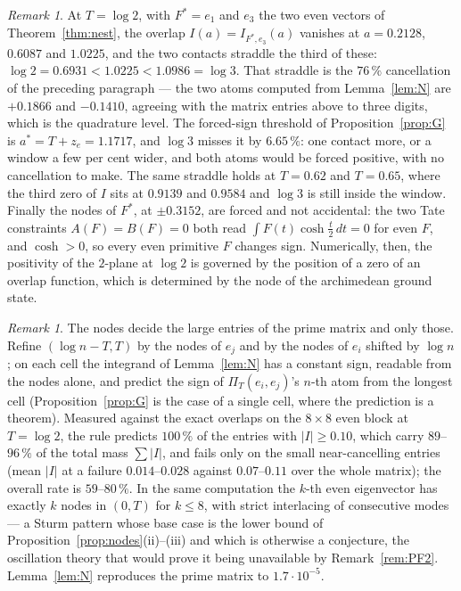 \documentclass[11pt]{amsart}
\theoremstyle{definition}
\theoremstyle{remark}
\newtheorem{remark}[theorem]{Remark}
\newcommand{\PiT}{\Pi_T}
\begin{document}
\begin{remark}\label{rem:nodal}
At $T=\log2$, with $F^*=e_1$ and $e_3$ the two even vectors of Theorem~\ref{thm:nest}, the overlap
$I(a)=I_{F^*,e_3}(a)$ vanishes at $a=0.2128$, $0.6087$ and $1.0225$, and the two contacts straddle
the third of these: $\log2=0.6931<1.0225<1.0986=\log3$. That straddle is the $76\,\%$ cancellation
of the preceding paragraph --- the two atoms computed from Lemma~\ref{lem:N} are $+0.1866$ and
$-0.1410$, agreeing with the matrix entries above to three digits, which is the quadrature level.
The forced-sign threshold of Proposition~\ref{prop:G} is $a^*=T+z_e=1.1717$, and $\log3$ misses it
by $6.65\,\%$: one contact more, or a window a few per cent wider, and both atoms would be forced
positive, with no cancellation to make. The same straddle holds at $T=0.62$ and $T=0.65$, where the
third zero of $I$ sits at $0.9139$ and $0.9584$ and $\log3$ is still inside the window. Finally the
nodes of $F^*$, at $\pm0.3152$, are forced and not accidental: the two Tate constraints
$A(F)=B(F)=0$ both read $\int F(t)\cosh\frac t2\,dt=0$ for even $F$, and $\cosh>0$, so every even
primitive $F$ changes sign. Numerically, then, the positivity of the $2$-plane at $\log2$ is
governed by the position of a zero of an overlap function, which is determined by the node of the
archimedean ground state.
\end{remark}

\begin{remark}\label{rem:signrule}
The nodes decide the large entries of the prime matrix and only those. Refine
$(\log n-T,T)$ by the nodes of $e_j$ and by the nodes of $e_i$ shifted by $\log n$; on each cell
the integrand of Lemma~\ref{lem:N} has a constant sign, readable from the nodes alone, and predict
the sign of $\PiT(e_i,e_j)$'s $n$-th atom from the longest cell (Proposition~\ref{prop:G} is the
case of a single cell, where the prediction is a theorem). Measured against the exact overlaps on
the $8\times8$ even block at $T=\log2$, the rule predicts $100\,\%$ of the entries with
$|I|\ge0.10$, which carry $89$--$96\,\%$ of the total mass $\sum|I|$, and fails only on the small
near-cancelling entries (mean $|I|$ at a failure $0.014$--$0.028$ against $0.07$--$0.11$ over the
whole matrix); the overall rate is $59$--$80\,\%$. In the same computation the $k$-th even
eigenvector has exactly $k$ nodes in $(0,T)$ for $k\le8$, with strict interlacing of consecutive
modes --- a Sturm pattern whose base case is the lower bound of
Proposition~\ref{prop:nodes}(ii)--(iii) and which is otherwise a conjecture, the oscillation theory
that would prove it being unavailable by Remark~\ref{rem:PF2}. Lemma~\ref{lem:N} reproduces the
prime matrix to $1.7\cdot10^{-5}$.
\end{remark}
\end{document}
